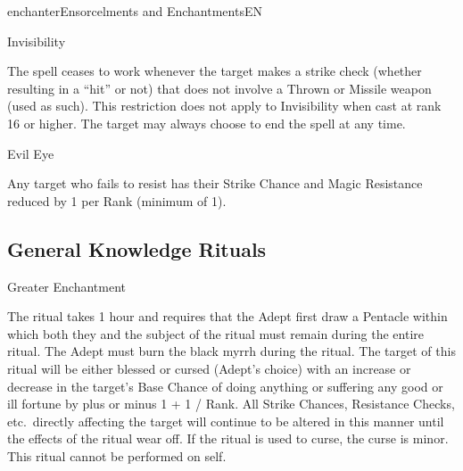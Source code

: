 \begin{college}[1.1]{enchanter}{Ensorcelments and Enchantments}{EN}
\begin{spell}[G-8]{Invisibility}
\begin{effects}
The spell ceases to work whenever the target makes a strike check
(whether resulting in a ``hit'' or not) that does not involve a Thrown
or Missile weapon (used as such). This restriction does not apply to
Invisibility when cast at rank 16 or higher. The target may always
choose to end the spell at any time.
\end{effects}
\end{spell}

\begin{spell}[G-9]{Evil Eye}

\begin{effects}

Any target who fails to resist has their Strike Chance and Magic
Resistance reduced by 1 per Rank (minimum of 1).
\end{effects}
\end{spell}

\subsection{General Knowledge Rituals}

\begin{ritual}[Q-1]{Greater Enchantment}

\begin{effects}
The ritual takes 1 hour and requires that the Adept first draw a
Pentacle within which both they and the subject of the ritual must
remain during the entire ritual.  The Adept must burn the black myrrh
during the ritual.  The target of this ritual will be either blessed
or cursed (Adept's choice) with an increase or decrease in the
target's Base Chance of doing anything or suffering any good or ill
fortune by plus or minus 1 + 1 / Rank. All Strike Chances, Resistance
Checks, etc.\ directly affecting the target will continue to be
altered in this manner until the effects of the ritual wear off. If
the ritual is used to curse, the curse is minor.  This ritual cannot
be performed on self.
\end{effects}
\end{ritual}


\end{college}
